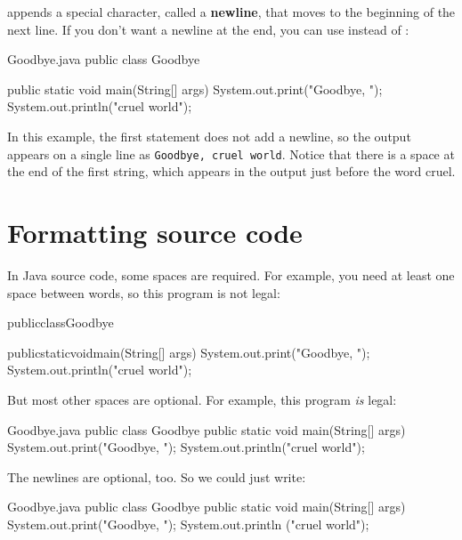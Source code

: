 
 appends a special character, called a {\bf newline}, that moves to the beginning of the next line.
If you don't want a newline at the end, you can use  instead of :


\begin{trinket}[235]{Goodbye.java}
public class Goodbye {

    public static void main(String[] args) {
        System.out.print("Goodbye, ");
        System.out.println("cruel world");
    }
}
\end{trinket}

\label{goodbye}

In this example, the first statement does not add a newline, so the output appears on a single line as {\tt Goodbye, cruel world}.
Notice that there is a space at the end of the first string, which appears in the output just before the word cruel.


\section{Formatting source code}
\label{formatting}

In Java source code, some spaces are required.
For example, you need at least one space between words, so this program is not legal:

\begin{code}
publicclassGoodbye{

    publicstaticvoidmain(String[] args) {
        System.out.print("Goodbye, ");
        System.out.println("cruel world");
    }
}
\end{code}

But most other spaces are optional.
For example, this program {\em is} legal:

\begin{trinket}[220]{Goodbye.java}
public class Goodbye {
public static void main(String[] args) {
System.out.print("Goodbye, ");
System.out.println("cruel world");
}
}
\end{trinket}

The newlines are optional, too.
So we could just write:

\begin{trinket}[175]{Goodbye.java}
public class Goodbye { public static void main(String[] args)
{ System.out.print("Goodbye, "); System.out.println
("cruel world");}}
\end{trinket}

